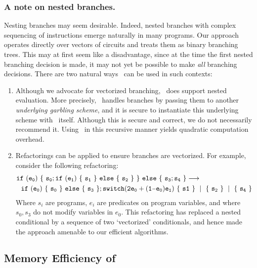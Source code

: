 \subsubsection{A note on nested branches.}
Nesting branches may seem desirable. Indeed, nested branches with
complex sequencing of instructions emerge
naturally in many programs.
%
Our approach operates directly over vectors of circuits and treats
them as binary branching trees.
This may at first seem like a disadvantage, since at the
time the first nested branching decision is made, it may not yet be
possible to make \emph{all} branching decisions.
%
There are two natural ways \ourschemelong\ can be used in such
contexts:
%
\begin{enumerate}
  \item Although we advocate for vectorized branching,
    \ourschemelong\ does support nested evaluation.
    More precisely, \ourschemelong\ handles branches by passing them
    to another \emph{underlying
    garbling scheme}, and it is secure to instantiate this underlying
    scheme with \ourschemelong\ itself.
    Although this is secure and correct, we do not necessarily
    recommend it. Using \ourschemelong\ in this recursive manner
    yields quadratic computation overhead.
  \item Refactorings can be applied to ensure branches
    are vectorized. For example, consider the following refactoring:
    \begin{align*}
      &{ \tt if~(e_0)~\{~s_0 ;
      if~(e_1)~\{~s_1~\}~else~\{~s_2~\}~\}~else~\{~s_3 ; s_4~\}
    \longrightarrow}
    \\
      &~~{ \tt if~(e_0)~\{~s_0~\}~else~\{~s_3~\};
        switch (2e_0 + (1 \minus e_0)e_1)~\{~s1~\}~\mid~\{~s_2~\}~\mid~\{~s_4~\}
    }
    \end{align*}
    Where $s_i$ are programs, $e_i$ are predicates on program
    variables, and where $s_0, s_3$ do not modify variables in $e_0$.
    This refactoring has replaced a nested conditional by a sequence
    of two `vectorized' conditionals, and hence made the approach
    amenable to our efficient algorithms.
\end{enumerate}
%


\subsection{Memory Efficiency of \ourschemelong}
\label{sec:memoryEfficiency}





